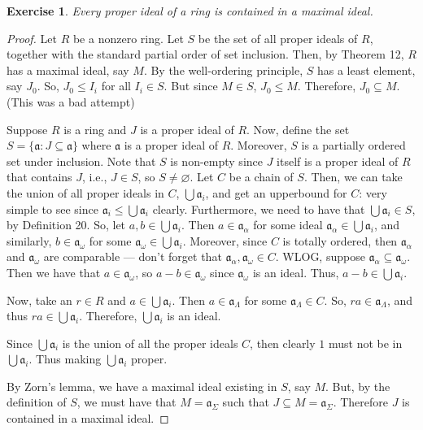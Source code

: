 \documentclass[12pt,reqno]{amsart}
\theoremstyle{plain}
\newtheorem{exercise}{Exercise}
\newcommand{\ideala}{\mathfrak{a}}
\begin{document}
\begin{exercise} Every proper ideal of a ring is contained in a maximal ideal. 
\end{exercise}
\begin{proof} Let $R$ be a nonzero ring. Let $S$ be the set of all proper ideals of $R$, together with the standard partial order of set inclusion. Then, by Theorem 12, $R$ has a maximal ideal, say $M$. By the well-ordering principle, $S$ has a least element, say $J_{0}$. So, $J_0 \leq I_i$ for all $I_i \in S$. But since $M \in S$, $J_0 \leq M$. Therefore, $J_0 \subseteq M$. (This was a bad attempt)

Suppose $R$ is a ring and $J$ is a proper ideal of $R$. Now, define the set $S = \{ \ideala \colon J \subseteq \ideala  \}$ where $\ideala$ is a proper ideal of $R$. Moreover, $S$ is a partially ordered set under inclusion. Note that $S$ is non-empty since $J$ itself is a proper ideal of $R$ that contains $J$, i.e., $J \in S$, so $S \neq \varnothing$. Let $C$ be a chain of $S$. Then, we can take the union of all proper ideals in $C$, $\bigcup \ideala_i$, and get an upperbound for $C$: very simple to see since $\ideala_i \leq \bigcup \ideala_i$ clearly. Furthermore, we need to have that $\bigcup \ideala_i \in S$, by Definition 20. So, let $a, b \in \bigcup \ideala_i$. Then $a \in \ideala_{\alpha}$ for some ideal $\ideala_{\alpha} \in \bigcup \ideala_i$, and similarly, $b \in \ideala_{\omega}$ for some $\ideala_{\omega} \in \bigcup \ideala_i$. Moreover, since $C$ is totally ordered, then $\ideala_{\alpha}$ and $\ideala_{\omega}$ are comparable — don't forget that $\ideala_{\alpha}, \ideala_{\omega} \in C$. WLOG, suppose $\ideala_{\alpha} \subseteq \ideala_{\omega}$. Then we have that $a \in \ideala_{\omega}$, so $a-b \in \ideala_{\omega}$ since $\ideala_{\omega}$ is an ideal. Thus, $a-b \in \bigcup \ideala_i$. 

Now, take an $r \in R$ and $a \in \bigcup \ideala_i$. Then $a \in  \ideala_{\Lambda}$ for some $\ideala_{\Lambda} \in C$. So, $ra \in \ideala_{\Lambda}$, and thus $ra \in \bigcup \ideala_i$. Therefore, $\bigcup \ideala_i$ is an ideal.

Since $\bigcup \ideala_i$ is the union of all the proper ideals $C$, then clearly $1$ must not be in $\bigcup \ideala_i$. Thus making $\bigcup \ideala_i$ proper. 

By Zorn's lemma, we have a maximal ideal existing in $S$, say $M$. But, by the definition of $S$, we must have that $M = \ideala_{\Sigma}$ such that $J \subseteq M=\ideala_{\Sigma}$. Therefore $J$ is contained in a maximal ideal. 
\end{proof}
\end{document}
